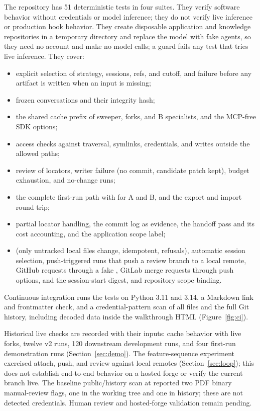 The repository has 51 deterministic tests in four suites. They verify software behavior without credentials or model inference; they do not verify live inference or production hook behavior. They create disposable application and knowledge repositories in a temporary directory and replace the model with fake agents, so they need no account and make no model calls; a guard fails any test that tries live inference. They cover:
\begin{itemize}[nosep]
  \item explicit selection of strategy, sessions, refs, and cutoff, and failure before any artifact is written when an input is missing;
  \item frozen conversations and their integrity hash;
  \item the shared cache prefix of sweeper, forks, and B specialists, and the MCP-free SDK options;
  \item access checks against traversal, symlinks, credentials, and writes outside the allowed paths;
  \item review of locators, writer failure (no commit, candidate patch kept), budget exhaustion, and no-change runs;
  \item the complete first-run path with  for A and B, and the export and import round trip;
  \item partial locator handling, the commit log as evidence, the handoff pass and its cost accounting, and the application scope label;
  \item {} (only untracked local files change, idempotent, refusals), automatic session selection, push-triggered runs that push a review branch to a local remote, GitHub requests through a fake , GitLab merge requests through push options,  and the session-start digest, and repository scope binding.
\end{itemize}

Continuous integration runs the tests on Python 3.11 and 3.14, a Markdown link and frontmatter check, and a credential-pattern scan of all files and the full Git history, including decoded data inside the walkthrough HTML (Figure~\ref{fig:ci}).

Historical live checks are recorded with their inputs: cache behavior with live forks, twelve v2 runs, 120 downstream development runs, and four first-run demonstration runs (Section~\ref{sec:demo}). The feature-sequence experiment exercised attach, push, and review against local remotes (Section~\ref{sec:loop}); this does not establish end-to-end behavior on a hosted forge or verify the current branch live. The baseline public/history scan at  reported two PDF binary manual-review flags, one in the working tree and one in history; these are not detected credentials. Human review and hosted-forge validation remain pending.

